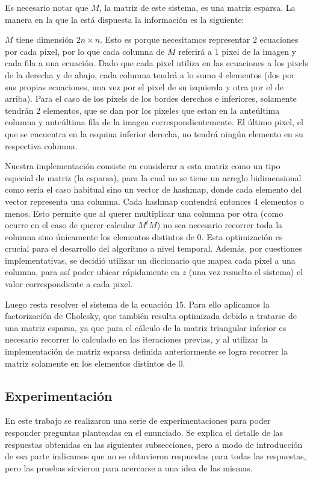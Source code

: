 Es necesario notar que $M$, la matriz de este sistema, es una matriz esparsa. La manera en la que la está dispuesta la información es la siguiente:

$M$ tiene dimensión $2n \times n$. Esto es porque necesitamos representar 2 ecuaciones por cada pixel, por lo que cada columna de $M$ referirá a $1$ pixel de la imagen y cada fila a una ecuación. Dado que cada pixel utiliza en las ecuaciones a los pixels de la derecha y de abajo, cada columna tendrá a lo sumo 4 elementos (dos por sus propias ecuaciones, una vez por el pixel de su izquierda y otra por el de arriba). Para el caso de los pixels de los bordes derechos e inferiores, solamente tendrán 2 elementos, que se dan por los pixeles que estan en la anteúltima columna y anteúltima fila de la imagen correspondientemente. El último pixel, el que se encuentra en la esquina inferior derecha, no tendrá ningún elemento en su respectiva columna.


Nuestra implementación consiste en considerar a esta matriz como un tipo especial de matriz (la esparsa), para la cual no se tiene un arreglo bidimensional como sería el caso habitual sino un vector de hashmap, donde cada elemento del vector representa una columna. Cada hashmap contendrá entonces 4 elementos o menos. Esto permite que al querer multiplicar una columna por otra (como ocurre en el caso de querer calcular $M^tM$) no sea necesario recorrer toda la columna sino únicamente los elementos distintos de 0. Esta optimización es crucial para el desarrollo del algoritmo a nivel temporal. Además, por cuestiones implementativas, se decidió utilizar un diccionario que mapea cada pixel a una columna, para así poder ubicar rápidamente en $z$ (una vez resuelto el sistema) el valor correspondiente a cada pixel.

Luego resta resolver el sistema de la ecuación 15. Para ello aplicamos la factorización de Cholesky, que también resulta optimizada debido a tratarse de una matriz esparsa, ya que para el cálculo de la matriz triangular inferior es necesario recorrer lo calculado en las iteraciones previas, y al utilizar la implementación de matriz esparsa definida anteriormente se logra recorrer la matriz solamente en los elementos distintos de 0.


\subsection{Experimentación}

En este trabajo se realizaron una serie de experimentaciones para poder responder preguntas planteadas en el enunciado. Se explica el detalle de las respuestas obtenidas en las siguientes subsecciones, pero a modo de introducción de esa parte indicamos que no se obtuvieron respuestas para todas las respuestas, pero las pruebas sirvieron para acercarse a una idea de las mismas.

